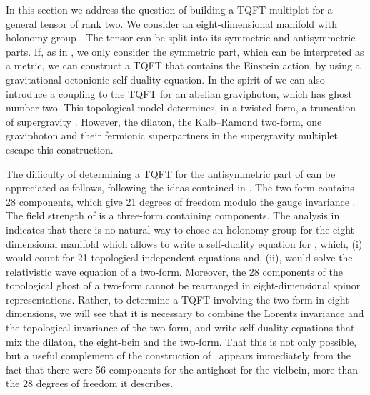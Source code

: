 \documentclass[a4paper,12pt]{article}
\begin{document}
In this section we address the question of building a TQFT multiplet
for a general tensor \coordHE{} of rank two.  We consider an
eight-dimensional manifold with holonomy group \coordHE{}.
The tensor \coordHE{} can be split into its symmetric and
antisymmetric parts.  If, as in \cite{BT2},  we  only consider  the
symmetric part, which can be interpreted as a metric, we can construct
a TQFT that contains the Einstein action, by using a gravitational
octonionic self-duality equation. In the spirit of \cite{BT1} we can
also introduce a coupling to the TQFT for an abelian graviphoton, which
has ghost number two. This topological model determines, in a twisted
form, a truncation of \coordHE{} supergravity \cite{BT2}.  However, the
dilaton, the Kalb--Ramond two-form, one graviphoton and their fermionic
superpartners in the \coordHE{} supergravity multiplet \cite{sase}
escape this construction.

The  difficulty of determining a TQFT for the antisymmetric part
\coordHE{} of \coordHE{} can be appreciated as follows, following the ideas
contained in \cite{laroche}. The two-form \coordHE{} contains 28 components,
which  give 21 degrees of freedom modulo the gauge invariance  
\coordHE{}.
The field strength of \coordHE{} is a three-form \coordHE{} containing
\coordHE{} components. The analysis in~\cite{laroche} indicates
that there is no natural way to chose an holonomy group for
the eight-dimensional manifold which allows to 
write a self-duality equation for \coordHE{}, which, (i)  
would count for 21 topological independent equations and, (ii),
would solve the relativistic wave equation of a two-form.
Moreover, the 28 components of the topological ghost of
a two-form cannot be rearranged in eight-dimensional spinor
representations. 
Rather, to determine a TQFT involving the two-form 
in eight dimensions, we will see that it is
necessary to combine the Lorentz invariance and the topological 
invariance of the two-form, and write self-duality equations that mix the
dilaton, the eight-bein and the two-form.  That this is not only possible,
but a useful complement of the construction of~\cite{BT2} appears
immediately from the fact that there were 56 components for the antighost
for the vielbein, more than the 28 degrees of freedom it describes.
\end{document}
